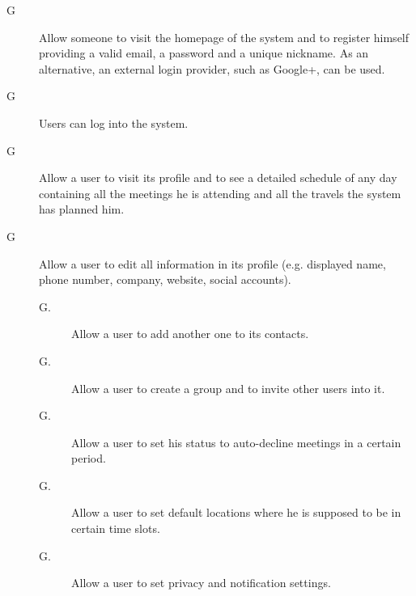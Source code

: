 
\begin{description}
\item[G\thecount\label{itm:G1}] Allow someone to visit the homepage of the system and to register himself providing a valid email, a password and a unique nickname. As an alternative, an external login provider, such as Google+, can be used.

\setcounter{countin}{1}

\item[G\thecount] Users can log into the system.

\setcounter{countin}{1}

\item[G\thecount] Allow a user to visit its profile and to see a detailed schedule of any day containing all the meetings he is attending and all the travels the system has planned him.

\setcounter{countin}{1}

\item[G\thecount] Allow a user to edit all information in its profile (e.g. displayed name, phone number, company, website, social accounts).
\begin{description}
\item[G\thecount.\thecountin] Allow a user to add another one to its contacts.
\item[G\thecount.\thecountin] Allow a user to create a group and to invite other users into it.
\item[G\thecount.\thecountin] Allow a user to set his status to auto-decline meetings in a certain period.
\item[G\thecount.\thecountin] Allow a user to set default locations where he is supposed to be in certain time slots.
\item[G\thecount.\thecountin] Allow a user to set privacy and notification settings.
\end{description}

\setcounter{countin}{1}


\end{description}
